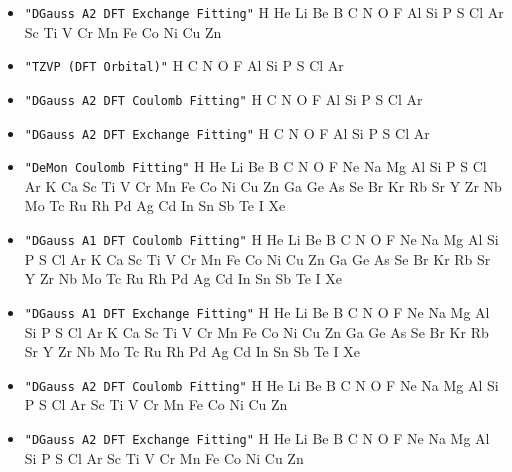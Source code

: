 \begin{itemize}
\item \verb#"DGauss A2 DFT Exchange Fitting"# \newline
 H He Li Be B C N O F Al Si P S Cl Ar Sc Ti V Cr Mn Fe Co Ni Cu Zn

\item \verb#"TZVP (DFT Orbital)"# \newline
 H C N O F Al Si P S Cl Ar

\item \verb#"DGauss A2 DFT Coulomb Fitting"# \newline
 H C N O F Al Si P S Cl Ar

\item \verb#"DGauss A2 DFT Exchange Fitting"# \newline
 H C N O F Al Si P S Cl Ar

\item \verb#"DeMon Coulomb Fitting"# \newline
 H He Li Be B C N O F Ne Na Mg Al Si P S Cl Ar K Ca Sc Ti V Cr Mn Fe Co
 Ni Cu Zn Ga Ge As Se Br Kr Rb Sr Y Zr Nb Mo Tc Ru Rh Pd Ag Cd In Sn Sb
 Te I Xe

\item \verb#"DGauss A1 DFT Coulomb Fitting"# \newline
 H He Li Be B C N O F Ne Na Mg Al Si P S Cl Ar K Ca Sc Ti V Cr Mn Fe Co
 Ni Cu Zn Ga Ge As Se Br Kr Rb Sr Y Zr Nb Mo Tc Ru Rh Pd Ag Cd In Sn Sb
 Te I Xe

\item \verb#"DGauss A1 DFT Exchange Fitting"# \newline
 H He Li Be B C N O F Ne Na Mg Al Si P S Cl Ar K Ca Sc Ti V Cr Mn Fe Co
 Ni Cu Zn Ga Ge As Se Br Kr Rb Sr Y Zr Nb Mo Tc Ru Rh Pd Ag Cd In Sn Sb
 Te I Xe

\item \verb#"DGauss A2 DFT Coulomb Fitting"# \newline
 H He Li Be B C N O F Ne Na Mg Al Si P S Cl Ar Sc Ti V Cr Mn Fe Co Ni Cu
 Zn

\item \verb#"DGauss A2 DFT Exchange Fitting"# \newline
 H He Li Be B C N O F Ne Na Mg Al Si P S Cl Ar Sc Ti V Cr Mn Fe Co Ni Cu
 Zn
\end{itemize}

\fussy

